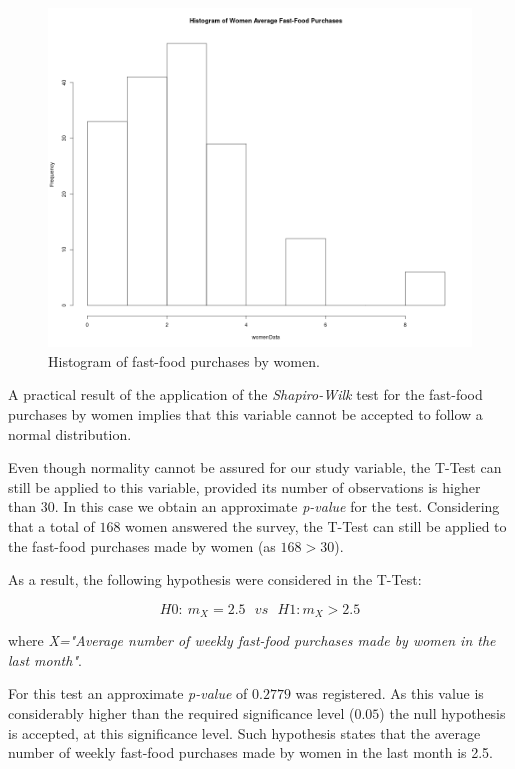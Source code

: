 \documentclass[12pt]{article}
\begin{document}
\begin{figure}[H]
	\centering
	\includegraphics[scale=0.28]{images/Histogram_WomenData.png}
	\caption{Histogram of fast-food purchases by women.}
	\label{histogram_women_purchases}
\end{figure}

A practical result of the application of the \emph{Shapiro-Wilk} test for the fast-food purchases by women implies that this variable cannot be accepted to follow a normal distribution.

Even though normality cannot be assured for our study variable, the T-Test  can still be applied to this variable, provided its number of observations is higher than $30$. In this case we obtain an approximate \emph{p-value} for the test. Considering that a total of $168$ women answered the survey, the T-Test can still be applied to the fast-food purchases made by women (as $168 > 30$).

As a result, the following hypothesis were considered in the T-Test:

$$ H0: \: m_{X} = 2.5 \: \: \: vs \: \: \: H1: m_{X} > 2.5$$

where \emph{X="Average number of weekly fast-food purchases made by women in the last month"}.

For this test an approximate \emph{p-value} of $0.2779$ was registered. As this value is considerably higher than the required significance level ($0.05$) the null hypothesis is accepted, at this significance level. Such hypothesis states that the average number of weekly fast-food purchases made by women in the last month is 2.5.
\end{document}
